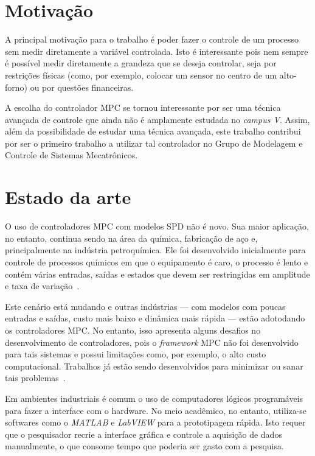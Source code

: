 \section{Motivação}%
\label{sec:motivacao}

A principal motivação para o trabalho é poder fazer o controle de um processo
sem medir diretamente a variável controlada. Isto é interessante pois nem sempre
é possível medir diretamente a grandeza que se deseja controlar, seja por
restrições físicas (como, por exemplo, colocar um sensor no centro de um
alto-forno) ou por questões financeiras.

A escolha do controlador \ac{MPC} se tornou interessante por ser uma técnica
avançada de controle que ainda não é amplamente estudada no \textit{campus V}.
Assim, além da possibilidade de estudar uma técnica avançada, este trabalho
contribui por ser o primeiro trabalho a utilizar tal controlador no Grupo de
Modelagem e Controle de Sistemas Mecatrônicos.

\section{Estado da arte}%
\label{sec:estado-da-arte}

O uso de controladores \ac{MPC} com modelos \ac{SPD} não é novo. Sua maior
aplicação, no entanto, continua sendo na área da química, fabricação de aço e,
principalmente na indústria petroquímica. Ele foi desenvolvido inicialmente para
controle de processos químicos em que o equipamento é caro, o processo é lento
e contém várias entradas, saídas e estados que devem ser restringidas em
amplitude e taxa de variação~\cite{article:cairano}.

Este cenário está mudando e outras indústrias --- com modelos com poucas
entradas e saídas, custo mais baixo e dinâmica mais rápida --- estão adotodando
os controladores \ac{MPC}\@. No entanto, isso apresenta alguns desafios no
desenvolvimento de controladores, pois o \textit{framework} \ac{MPC} não foi
desenvolvido para tais sistemas e possui limitações como, por exemplo, o alto
custo computacional. Trabalhos já estão sendo desenvolvidos para minimizar ou
sanar tais problemas~\cite{article:cairano}.

Em ambientes industriais é comum o uso de computadores lógicos programáveis para
fazer a interface com o hardware. No meio acadêmico, no entanto, utiliza-se
softwares como o \textit{MATLAB} e \textit{LabVIEW} para a prototipagem rápida.
Isto requer que o pesquisador recrie a interface gráfica e controle a aquisição
de dados manualmente, o que consome tempo que poderia ser gasto com a pesquisa.

